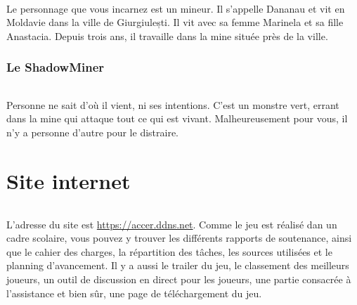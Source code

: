 \documentclass[titlepage, 11px, a4paper]{report}
\begin{document}
\paragraph*{} \hspace{0pt}
Le personnage que vous incarnez est un mineur. Il s'appelle Dananau et vit en Moldavie dans la ville 
de Giurgiulești. Il vit avec sa femme Marinela et sa fille Anastacia. 
Depuis trois ans, il travaille dans la mine située près de la ville. \\

\section{Le ShadowMiner}
\paragraph*{} \hspace{0pt}
Personne ne sait d'où il vient, ni ses intentions. C'est un monstre vert, errant dans la mine qui attaque tout ce qui est vivant. 
Malheureusement pour vous, il n'y a personne d'autre pour le distraire. \\


\newpage


\part{Site internet} 
\paragraph*{} \hspace{0pt}
L'adresse du site est \url{https://accer.ddns.net}. Comme le jeu est réalisé dan un cadre scolaire, 
vous pouvez y trouver les différents rapports de soutenance, ainsi que le cahier des charges, la 
répartition des tâches, les sources utilisées et le planning d'avancement. Il y a aussi le trailer 
du jeu, le classement des meilleurs joueurs, un outil de discussion en direct pour les joueurs,  
une partie consacrée à l'assistance et bien sûr, une page de téléchargement du jeu. \\


\newpage

\end{document}
